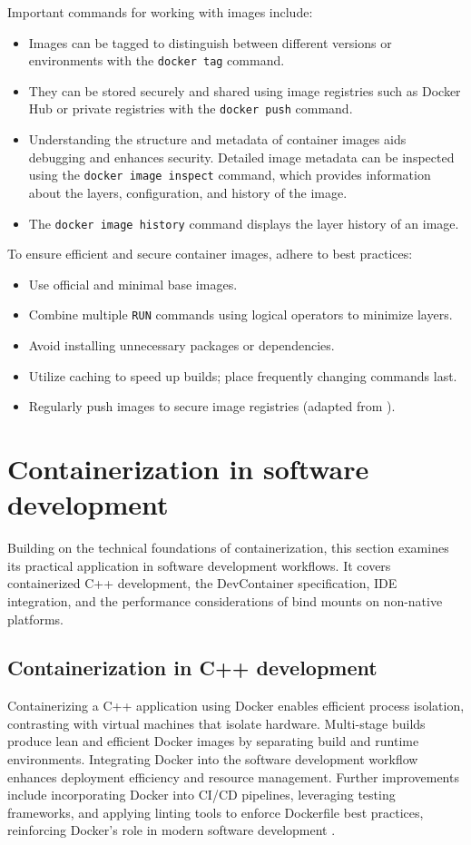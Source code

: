 \newpage
Important commands for working with images include:
\begin{itemize}
    \item Images can be tagged to distinguish between different versions or environments with the \texttt{docker tag} command.
    \item They can be stored securely and shared using image registries such as Docker Hub or private registries with the \texttt{docker push} command.
    \item Understanding the structure and metadata of container images aids debugging and enhances security.
          Detailed image metadata can be inspected using the \texttt{docker image inspect} command, which provides information about the layers, configuration, and history of the image.
    \item The \texttt{docker image history} command displays the layer history of an image.
\end{itemize}

To ensure efficient and secure container images, adhere to best practices:
\begin{itemize}
    \item Use official and minimal base images.
    \item Combine multiple \texttt{RUN} commands using logical operators to minimize layers.
    \item Avoid installing unnecessary packages or dependencies.
    \item Utilize caching to speed up builds; place frequently changing commands last.
    \item Regularly push images to secure image registries (adapted from \cite{dockerDockerReferenceDocumentation2025}).
\end{itemize}

\section{Containerization in software development}
Building on the technical foundations of containerization, this section examines its practical application in software development workflows.
It covers containerized C++ development, the DevContainer specification, IDE integration, and the performance considerations of bind mounts on non-native platforms.

\subsection{Containerization in C++ development}
Containerizing a C++ application using Docker enables efficient process isolation, contrasting with virtual machines that isolate hardware.
Multi-stage builds produce lean and efficient Docker images by separating build and runtime environments.
Integrating Docker into the software development workflow enhances deployment efficiency and resource management.
Further improvements include incorporating Docker into CI/CD pipelines, leveraging testing frameworks, and applying linting tools to enforce Dockerfile best practices, reinforcing Docker's role in modern software development \citep{gohringPracticalGuideContainerize2022}.

